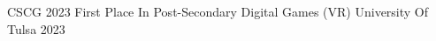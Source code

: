 

\begin{cvhonors}

  \cvhonor
    {CSCG 2023 First Place In Post-Secondary Digital Games (VR)} %
    {University Of Tulsa} %
    {} %
    {2023} %

\end{cvhonors}
